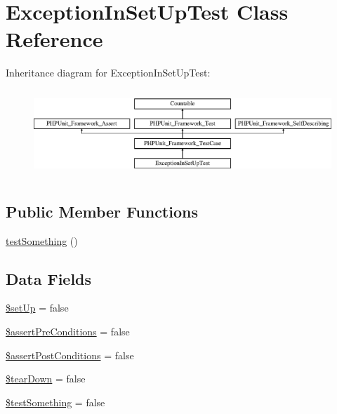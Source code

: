 \hypertarget{class_exception_in_set_up_test}{}\section{Exception\+In\+Set\+Up\+Test Class Reference}
\label{class_exception_in_set_up_test}
Inheritance diagram for Exception\+In\+Set\+Up\+Test\+:\begin{figure}[H]
\begin{center}
\leavevmode
\includegraphics[height=3.303835cm]{class_exception_in_set_up_test}
\end{center}
\end{figure}
\subsection*{Public Member Functions}
\begin{DoxyCompactItemize}
\item 
\mbox{\hyperlink{class_exception_in_set_up_test_a0fc4e17369bc9607ebdd850d9eda8167}{test\+Something}} ()
\end{DoxyCompactItemize}
\subsection*{Data Fields}
\begin{DoxyCompactItemize}
\item 
\mbox{\hyperlink{class_exception_in_set_up_test_aed7dec37f7cfd2a33216b3f81ebaeb8e}{\$set\+Up}} = false
\item 
\mbox{\hyperlink{class_exception_in_set_up_test_af1c82be5eeeef75035a066c7cc2eb172}{\$assert\+Pre\+Conditions}} = false
\item 
\mbox{\hyperlink{class_exception_in_set_up_test_ae16868ae0cb9f100fb80bf4987de5a85}{\$assert\+Post\+Conditions}} = false
\item 
\mbox{\hyperlink{class_exception_in_set_up_test_a9639b8e6f680299142ffe313f876712f}{\$tear\+Down}} = false
\item 
\mbox{\hyperlink{class_exception_in_set_up_test_a25acbdb5bf8dc30b31f537d60bfb02f5}{\$test\+Something}} = false
\end{DoxyCompactItemize}
